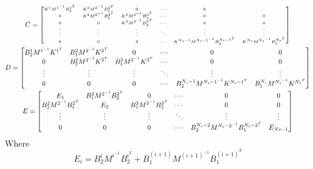 \documentclass{article}
\begin{document}
\begin{multline}
\\\tiny
C = 
\begin{bmatrix}
K^1 M^{1^{-1}} B_2^{1^{T}} & K^2 M^{2^{-1}} B_1^{2^{T}} & 0 & \cdots & 0\\
 0 & K^2 M^{2^{-1}} B_2^{2^{T}} & K^3 M^{3^{-1}} B_1^{3^{T}} & \cdots & 0 & 0\\
 0 & 0 & K^3 M^{3^{-1}} B_2^{3^{T}} & \cdots & 0 & 0\\
 \vdots & \vdots & \vdots & \ddots & \vdots & \vdots \\
0 & 0 & 0 & \cdots & K^{N_s-1} M^{{N_s-1}^{-1}} B_2^{{N_s-1}^{T}} & K^{N_s} M^{{N_s}^{-1}} B_1^{{N_s}^{T}}\\
\end{bmatrix}
\\
D =
\begin{bmatrix}
B^1_2 M^{1^{-1}} K^{1^{T}} &  B^2_1 M^{2^{-1}} K^{2^{T}} & 0 & \cdots & 0 & 0 \\
0 & B^2_2 M^{2^{-1}} K^{2^{T}} & B^3_1 M^{3^{-1}} K^{3^{T}} & \cdots & 0 & 0 \\
 \vdots & \vdots & \vdots & \ddots & \vdots & \vdots \\
 0 & 0 & 0 & \cdots & B^{N_s-1}_2 M^{{N_s-1}^{-1}} K^{{N_s-1}^{T}} &  B^{N_s}_1 M^{{N_s}^{-1}} K^{{N_s}^{T}} 
\end{bmatrix}
\\
E = 
\begin{bmatrix}
E_1 & B^2_1 M^{2^{-1}} B_2^{2^{T}} & 0 & \cdots & 0 & 0 \\
 B^2_2 M^{2^{-1}} B_1^{2^{T}} & E_2 & B^3_1 M^{3^{-1}} B_2^{3^{T}} & \cdots & 0 & 0 \\
 \vdots & \vdots & \vdots & \ddots & \vdots & \vdots \\
  0 & 0 & 0 & \cdots & B^{N_s-2}_2 M^{{N_s-2}^{-1}} B_1^{{N_s-2}^{T}} &  E_{Ns-1}
\end{bmatrix}
\end{multline}
Where 
\begin{equation}
    E_i = B^i_2 M^{i^{-1}} B_2^{i^{T}} + B^{(i+1)}_1 M^{{(i+1)}^{-1}} B_1^{{(i+1)}^{T}}
\end{equation}
\end{document}
